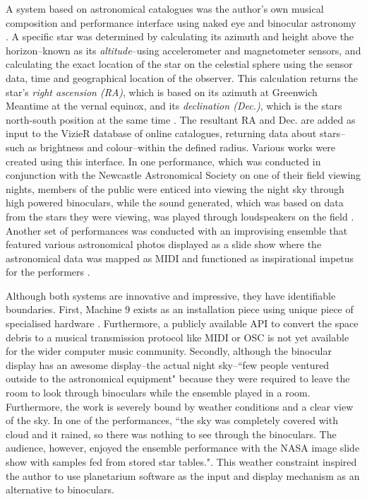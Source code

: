 A system based on astronomical catalogues was the author's own musical composition and performance interface using naked eye and binocular astronomy \cite{fraietta2014musical}. A specific star was determined by calculating its azimuth and height above the horizon--known as its \textit {altitude}--using  accelerometer and magnetometer sensors, and calculating the exact location of the star on the celestial sphere using the sensor data, time and geographical location of the observer. This calculation returns the star's \textit{right ascension (RA)}, which is based on its azimuth at Greenwich Meantime at the vernal equinox,  and its \textit{declination (Dec.)}, which is the stars north-south position at the same time \cite{duffett2011practical, fraietta2014musical}. The resultant RA and Dec. are added as input to the VizieR database of online catalogues, returning data about stars--such as brightness and colour--within the defined radius. Various works were created using this interface. In one performance, which was  conducted in conjunction with the Newcastle Astronomical Society on one of their field viewing nights, members of the  public were enticed into viewing the night sky through high powered binoculars, while the sound generated, which was  based on data from the stars they were viewing, was played through loudspeakers on the field \cite{fraietta_segue}. 
Another set of performances was conducted with an improvising ensemble that featured various astronomical photos displayed as a slide show where the astronomical data was mapped as MIDI and functioned as inspirational impetus for the performers \cite{BriightSyzygy}. 

Although both systems are innovative and impressive, they have identifiable boundaries. First, Machine 9 exists as an installation piece using unique piece of specialised hardware \cite{spaceDebrisYoutube}.  Furthermore, a publicly available API to convert the space debris to a musical transmission protocol like MIDI or OSC \cite{wright1997open} is not yet available for the wider computer music community. Secondly, although the binocular display has an awesome display--the actual night sky--``few people ventured outside to the astronomical equipment"\cite[p. ~50]{fraietta2014musical} because they were required to leave the room to look through binoculars while the ensemble played in a room. Furthermore, the work is severely bound by weather conditions and a clear view of the sky. In one of the performances, ``the sky was completely covered with cloud and it rained, so there was nothing to see through the binoculars. The audience, however, enjoyed the ensemble performance with the NASA image slide show with samples fed from stored star tables."\cite[p. ~50]{fraietta2014musical}.  This weather constraint inspired the author to use planetarium software as the input and display mechanism as an alternative to binoculars.  

